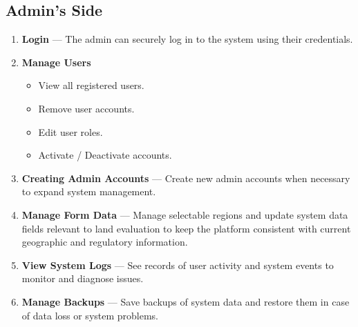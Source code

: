 \documentclass[12pt,oneside]{report}
\begin{document}
\subsection{Admin's Side}
\begin{enumerate}[leftmargin=*,label=\arabic*.,align=left]
  \item \textbf{Login} — The admin can securely log in to the system using their credentials.

  \item \textbf{Manage Users}
  \begin{itemize}[leftmargin=1.2em]
    \item View all registered users.
    \item Remove user accounts.
    \item Edit user roles.
    \item Activate / Deactivate accounts.
  \end{itemize}

  \item \textbf{Creating Admin Accounts} — Create new admin accounts when necessary to expand system management.

  \item \textbf{Manage Form Data} — Manage selectable regions and update system data fields relevant to land evaluation to keep the platform consistent with current geographic and regulatory information.

  \item \textbf{View System Logs} — See records of user activity and system events to monitor and diagnose issues.

  \item \textbf{Manage Backups} — Save backups of system data and restore them in case of data loss or system problems.
\end{enumerate}
\end{document}

